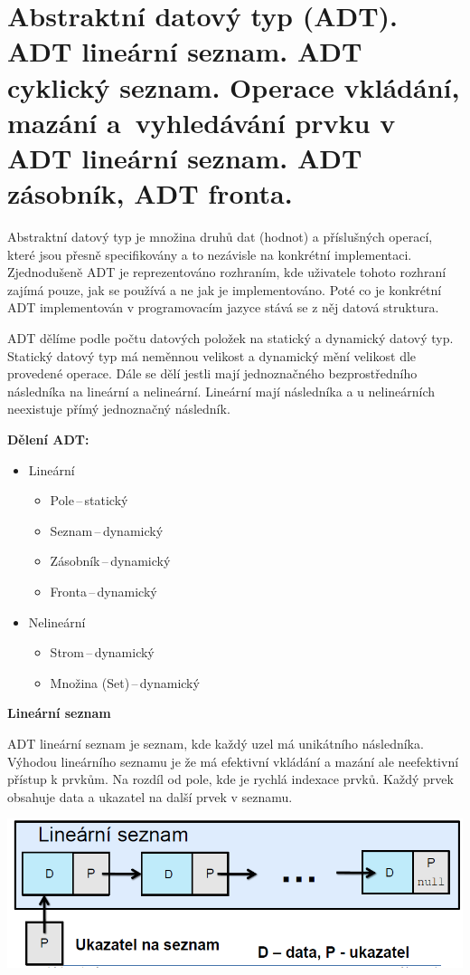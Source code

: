 \newpage
\section{Abstraktní datový typ (ADT). ADT lineární seznam. ADT cyklický seznam. Operace vkládání, mazání a~vyhledávání prvku v ADT lineární seznam. ADT zásobník, ADT fronta.}

Abstraktní datový typ je množina druhů dat (hodnot) a příslušných operací, které jsou přesně specifikovány a to nezávisle na konkrétní implementaci. Zjednodušeně ADT je reprezentováno rozhraním, kde uživatele tohoto rozhraní zajímá pouze, jak se používá a ne jak je implementováno. Poté co je konkrétní ADT implementován v programovacím jazyce stává se z něj datová struktura.

ADT dělíme podle počtu datových položek na statický a dynamický datový typ. Statický datový typ má neměnnou velikost a dynamický mění velikost dle provedené operace. Dále se dělí jestli mají jednoznačného bezprostředního následníka na lineární a nelineární. Lineární mají následníka a u nelineárních neexistuje přímý jednoznačný následník.

\textbf{Dělení ADT:}
\begin{itemize}
    \item Lineární
    \begin{itemize}
        \item Pole\,--\,statický
        \item Seznam\,--\,dynamický
        \item Zásobník\,--\,dynamický
        \item Fronta\,--\,dynamický
    \end{itemize}
    \item Nelineární
    \begin{itemize}
        \item Strom\,--\,dynamický
        \item Množina (Set)\,--\,dynamický
    \end{itemize}
\end{itemize}

\begin{Large}\vspace{0,5cm} \textbf{Lineární seznam}
\end{Large}

ADT lineární seznam je seznam, kde každý uzel má unikátního následníka.
Výhodou lineárního seznamu je že má efektivní vkládání a mazání ale neefektivní přístup k prvkům. Na rozdíl od pole, kde je rychlá indexace prvků. Každý prvek obsahuje data a ukazatel na další prvek v seznamu.
\begin{center}
    \includegraphics[scale=0.5]{BPC-TIN/images/linsez.PNG}
\end{center}

